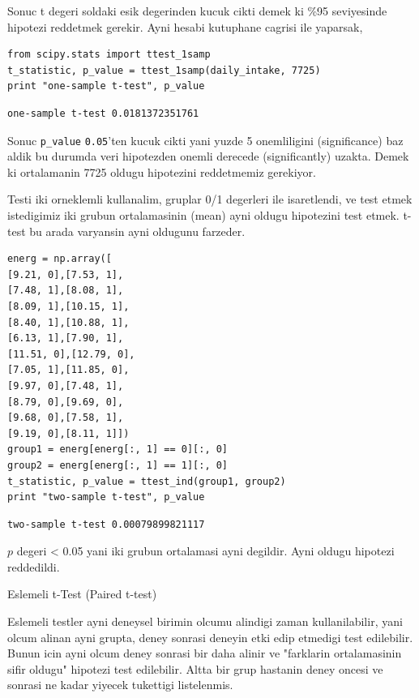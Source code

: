 \documentclass[12pt,fleqn]{article}\usepackage{../common}
\begin{document}
Sonuc t degeri soldaki esik degerinden kucuk cikti demek ki \%95
seviyesinde hipotezi reddetmek gerekir. Ayni hesabi kutuphane cagrisi ile
yaparsak,

\begin{verbatim}
from scipy.stats import ttest_1samp
t_statistic, p_value = ttest_1samp(daily_intake, 7725)
print "one-sample t-test", p_value
\end{verbatim}

\begin{verbatim}
one-sample t-test 0.0181372351761
\end{verbatim}

Sonuc \verb!p_value! \verb!0.05!'ten kucuk cikti yani yuzde 5 onemliligini
(significance) baz aldik bu durumda veri hipotezden onemli derecede
(significantly) uzakta. Demek ki ortalamanin 7725 oldugu hipotezini
reddetmemiz gerekiyor.

Testi iki orneklemli kullanalim, gruplar 0/1 degerleri ile
isaretlendi, ve test etmek istedigimiz iki grubun ortalamasinin (mean)
ayni oldugu hipotezini test etmek. t-test bu arada varyansin ayni
oldugunu farzeder.

\begin{verbatim}
energ = np.array([
[9.21, 0],[7.53, 1],
[7.48, 1],[8.08, 1],
[8.09, 1],[10.15, 1],
[8.40, 1],[10.88, 1],
[6.13, 1],[7.90, 1],
[11.51, 0],[12.79, 0],
[7.05, 1],[11.85, 0],
[9.97, 0],[7.48, 1],
[8.79, 0],[9.69, 0],
[9.68, 0],[7.58, 1],
[9.19, 0],[8.11, 1]])
group1 = energ[energ[:, 1] == 0][:, 0]
group2 = energ[energ[:, 1] == 1][:, 0]
t_statistic, p_value = ttest_ind(group1, group2)
print "two-sample t-test", p_value
\end{verbatim}

\begin{verbatim}
two-sample t-test 0.00079899821117
\end{verbatim}

$p$ degeri < 0.05 yani iki grubun ortalamasi ayni degildir. Ayni oldugu
hipotezi reddedildi.

Eslemeli t-Test (Paired t-test)

Eslemeli testler ayni deneysel birimin olcumu alindigi zaman
kullanilabilir, yani olcum alinan ayni grupta, deney sonrasi deneyin
etki edip etmedigi test edilebilir. Bunun icin ayni olcum deney
sonrasi bir daha alinir ve "farklarin ortalamasinin sifir oldugu"
hipotezi test edilebilir. Altta bir grup hastanin deney oncesi ve
sonrasi ne kadar yiyecek tukettigi listelenmis. 
\end{document}
